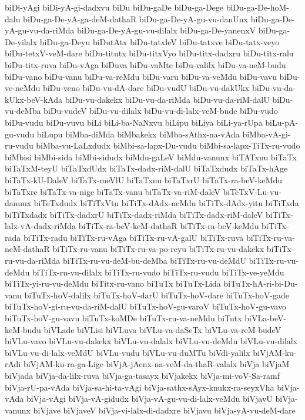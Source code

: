 {biDi-yAgi
biDi-yA-gi-dadxvu
biDu
biDu-gaDe
biDu-ga-Dege
biDu-ga-De-hoM-dalu
biDu-ga-De-yA-ga-deM-dathaR
biDu-ga-De-yA-gu-vu-danUnx
biDu-ga-De-yA-gu-vu-da-riMda
biDu-ga-De-yA-gu-vu-dilalx
biDu-ga-De-yanenxV
biDu-ga-De-yilalx
biDu-ga-Deyu
biDutAtx
biDu-tatxleV
biDu-tatxve
biDu-tatx-veyo
biDu-tetxV-veM-dare
biDu-titutx
biDu-titxVyo
biDu-titx-dadxru
biDu-titx-ralu
biDu-titx-ruva
biDu-vAga
biDuva
biDu-vaMte
biDu-valilx
biDu-va-neM-budu
biDu-vano
biDu-vanu
biDu-va-reMdu
biDu-varu
biDu-va-veMdu
biDu-vavu
biDu-ve-neMdu
biDu-veno
biDu-vu-dA-dare
biDu-vudU
biDu-vu-dakUkx
biDu-vu-da-kUkx-beV-kAda
biDu-vu-dakekx
biDu-vu-da-riMda
biDu-vu-da-riM-dalU
biDu-vu-deMba
biDu-vudeV
biDu-vu-dilalx
biDu-vu-di-lalx-veM-bude
biDu-vudo
biDu-vudu
biDu-vuvu
biLi
biLi-ba-NaNxvu
biLipu
biLiya
biLi-ya-rUpa
biLu-pA-gu-vudu
biLupu
biMba-diMda
biMbakekx
biMba-sAthx-na-vAda
biMba-vA-gi-ru-vudu
biMba-vu-LaLxdudx
biMbi-sa-lapx-Du-vudu
biMbi-sa-lapx-TiTx-ru-vudo
biMbisi
biMbi-sida
biMbi-sidudx
biMdu-gaLeV
biMdu-vanunx
biTATxnu
biTaTx
biTaTxM-teyU
biTaTxdUdx
biTaTx-dadx-riM-dalU
biTaTxdudx
biTaTx-hAge
biTaTx-kU-DaleV
biTaTx-meVlU
biTaTxnu
biTaTxrU
biTaTx-ra-beV-keMdu
biTaTxre
biTaTx-va-nige
biTaTx-vanu
biTaTx-va-riM-daleV
biTeTxV-Lu-vu-danunx
biTeTxdudx
biTiTxVtu
biTiTx-dAdx-neMdu
biTiTx-dAdx-yitu
biTiTxda
biTiTxdadx
biTiTx-dadxrU
biTiTx-dadx-riMda
biTiTx-dadx-riM-daleV
biTiTx-lalx-vA-dadx-riMda
biTiTx-ra-beV-keM-dathaR
biTiTx-ra-beV-keMdu
biTiTx-rada
biTiTx-radu
biTiTx-ru-vAga
biTiTx-ru-vA-galU
biTiTx-ruva
biTiTx-ru-va-neM-dathaR
biTiTx-ru-vanu
biTiTx-ru-va-po-reyu
biTiTx-ru-vu-dakekx
biTiTx-ru-vu-da-riMda
biTiTx-ru-vu-deM-bu-deMba
biTiTx-ru-vu-deMdU
biTiTx-ru-vu-deMdu
biTiTx-ru-vu-dilalx
biTiTx-ru-vudo
biTiTx-ru-vudu
biTiTx-ve-yeMdu
biTiTx-yi-ru-vu-deMdu
biTitx-ru-vano
biTuTx
biTuTx-Lida
biTuTx-hA-ri-bi-Du-vanu
biTuTx-hoV-dalilx
biTuTx-hoV-darU
biTuTx-hoV-dare
biTuTx-hoV-gade
biTuTx-hoV-gi-ru-vu-da-riM-dalU
biTuTx-hoV-gu-varoV
biTuTx-hoV-gu-vavo
biTuTx-hoV-gu-vavu
biTuTx-koMDe
biTuTx-ru-va-neMdu
biTutx
biVLa-beV-keM-budu
biVLade
biVLisi
biVLuva
biVLu-va-daSeTx
biVLu-va-reM-budeV
biVLu-vavo
biVLu-vu-dakekx
biVLu-vu-dalalx
biVLu-vu-deMdu
biVLu-vu-dilalx
biVLu-vu-di-lalx-veMdU
biVLu-vudu
biVLu-vu-duMTu
biVdi-yalilx
biVjAM-ku-rAdi
biVjAM-ku-ra-ga-Lige
biVjA-jAcnx-na-veM-da-thaR-valalx
biVja
biVjaM
biVjada
biVja-da-lilx-ruva
biVja-ga-tasayx
biVjakekx
biVja-mi-voV-Sa-ramf
biVja-rU-pa-vAda
biVja-sa-hi-ta-vAgi
biVja-sathx-sAyx-knukx-ra-seyxVha
biVja-vAda
biVja-vAgi
biVja-vA-gidudx
biVja-vA-gu-vu-di-lalx-veMdu
biVjavU
biVja-vanunx
biVjave
biVjaveV
biVja-vi-lalx-di-dadxre
biVjavu
biVja-yA-vu-deM-dare
}
